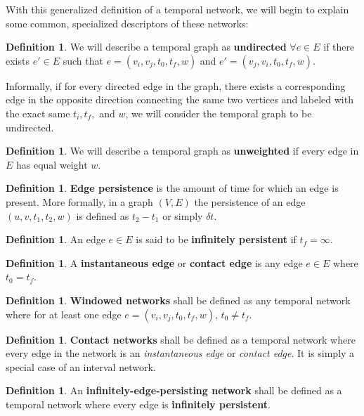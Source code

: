 \documentclass{article}
\theoremstyle{definition}
\newtheorem{defn}[thm]{Definition}
\numberwithin{thm}{subsection}
\begin{document}
With this generalized definition of a temporal network, we will begin to explain
some common, specialized descriptors of these networks:

\begin{defn}
  We will describe a temporal graph as \textbf{undirected} $\forall e \in E$
  if there exists $e' \in E$ such that $e = (v_i, v_j, t_0, t_f,w)$ and $e' =
  (v_j, v_i, t_0, t_f, w)$.

  Informally, if for every directed edge in the graph, there exists a
  corresponding edge in the opposite direction connecting the same two
  vertices and labeled with the exact same $t_i, t_f,$ and $w$, we will consider
  the temporal graph to be undirected.
\end{defn}

\begin{defn}
  We will describe a temporal graph as \textbf{unweighted} if every edge in $E$
  has equal weight $w$.
\end{defn}

\begin{defn}
  \textbf{Edge persistence} is the amount of time for which an edge is present.
  More formally, in a graph $(V,E)$ the persistence of an edge $(u,v,t_1,t_2,
  w)$ is defined as $t_2 - t_1$ or simply $\delta t$.
\end{defn}

\begin{defn}
  An edge $e \in E$ is said to be \textbf{infinitely persistent}
  if $t_f = \infty$.
\end{defn}

\begin{defn}
  A \textbf{instantaneous edge} or \textbf{contact edge} is any edge $e \in E$
  where $t_0 = t_f$.
\end{defn}

\begin{defn}
  \textbf{Windowed networks} shall be defined as
  any temporal network where for at least one edge $e = (v_i, v_j, t_0, t_f,w)$,
  $t_0 \neq t_f$.
\end{defn}

\begin{defn}
  \textbf{Contact networks} shall be defined as a temporal network where
  every edge in the network is an \textit{instantaneous edge} or \textit{contact
  edge}. It is simply a special case of an interval network.
\end{defn}

\begin{defn}
  An \textbf{infinitely-edge-persisting network} shall be defined as a temporal
  network where every edge is \textbf{infinitely persistent}.
\end{defn}
\end{document}

